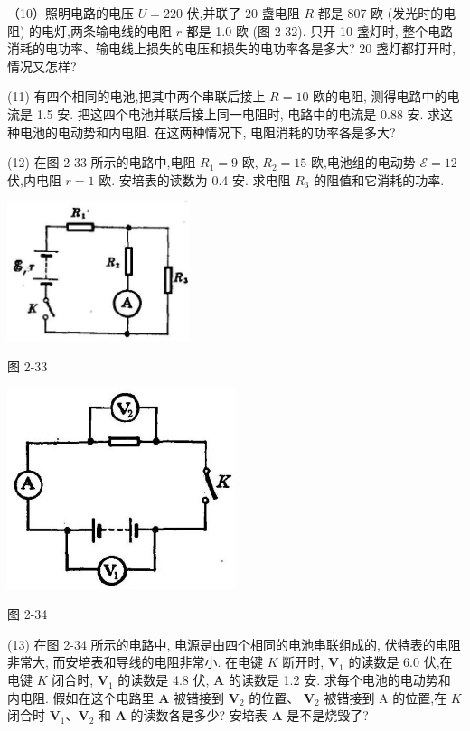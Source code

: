 \documentclass[10pt]{article}
\begin{document}
（10）照明电路的电压 \(U = {220}\) 伏,并联了 20 盏电阻 \(R\) 都是 807 欧 (发光时的电阻) 的电灯,两条输电线的电阻 \(r\) 都是 1.0 欧 (图 2-32). 只开 10 盏灯时, 整个电路消耗的电功率、输电线上损失的电压和损失的电功率各是多大? 20 盏灯都打开时, 情况又怎样?

(11) 有四个相同的电池,把其中两个串联后接上 \(R = {10}\) 欧的电阻, 测得电路中的电流是 1.5 安. 把这四个电池并联后接上同一电阻时, 电路中的电流是 0.88 安. 求这种电池的电动势和内电阻. 在这两种情况下, 电阻消耗的功率各是多大?

(12) 在图 2-33 所示的电路中,电阻 \({R}_{1} = 9\) 欧, \({R}_{2} = {15}\) 欧,电池组的电动势 \(\mathcal{E} = {12}\) 伏,内电阻 \(r = 1\) 欧. 安培表的读数为 0.4 安. 求电阻 \({R}_{3}\) 的阻值和它消耗的功率.

\begin{center}
\includegraphics[max width=0.4\textwidth]{images/01913056-1f15-74d8-9184-9aab52c9d66b_102_869075.jpg}
\end{center}

图 2-33

\begin{center}
\includegraphics[max width=0.5\textwidth]{images/01913056-1f15-74d8-9184-9aab52c9d66b_102_713259.jpg}
\end{center}

图 2-34

(13) 在图 2-34 所示的电路中, 电源是由四个相同的电池串联组成的, 伏特表的电阻非常大, 而安培表和导线的电阻非常小. 在电键 \(K\) 断开时, \({\mathbf{V}}_{1}\) 的读数是 6.0 伏,在电键 \(K\) 闭合时, \({\mathbf{V}}_{1}\) 的读数是 4.8 伏, \(\mathbf{A}\) 的读数是 1.2 安. 求每个电池的电动势和内电阻. 假如在这个电路里 \(\mathbf{A}\) 被错接到 \({\mathbf{V}}_{2}\) 的位置、 \({\mathbf{V}}_{2}\) 被错接到 \(\mathrm{A}\) 的位置,在 \(K\) 闭合时 \({\mathbf{V}}_{1}\text{、}{\mathbf{V}}_{2}\) 和 \(\mathbf{A}\) 的读数各是多少? 安培表 \(\mathbf{A}\) 是不是烧毁了?
\end{document}
